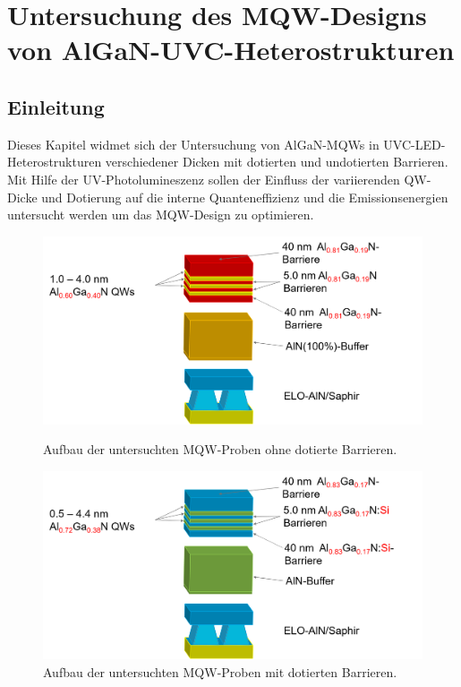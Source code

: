 \thispagestyle{fancy}
\justifying
\chapter{Untersuchung des MQW-Designs von AlGaN-UVC-Heterostrukturen}
\label{chap:mqw}
\section{Einleitung}
Dieses Kapitel widmet sich der Untersuchung von AlGaN-MQWs in UVC-LED-Heterostrukturen verschiedener Dicken mit dotierten und undotierten Barrieren. Mit Hilfe der UV-Photolumineszenz sollen der Einfluss der variierenden QW-Dicke und Dotierung auf die interne Quanteneffizienz und die Emissionsenergien untersucht werden um das MQW-Design zu optimieren.
\begin{figure}[H]
  \centering
  \begin{minipage}[t]{0.45\textwidth}
    \centering
    \includegraphics[width=\textwidth]{Bilder/MQWdickenSerie/undotiert}
		\caption{Aufbau der untersuchten MQW-Proben ohne dotierte Barrieren.}
    \label{fig:undotiert}
  \end{minipage}
	\hfill
  \begin{minipage}[t]{0.45\textwidth}
    \centering
    \includegraphics[width=\linewidth]{Bilder/MQWdickenSerie/dotiert}
		\caption{Aufbau der untersuchten MQW-Proben mit dotierten Barrieren.}
    \label{fig:dotiert}
  \end{minipage}
\end{figure}
